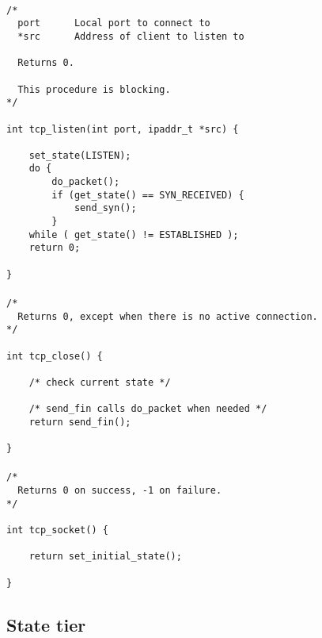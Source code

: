 \documentclass[11pt]{article}
\begin{document}
\paragraph{}


\begin{lstlisting}[title=Procedure tcp\_listen]
/*
  port      Local port to connect to
  *src      Address of client to listen to

  Returns 0.

  This procedure is blocking.
*/

int tcp_listen(int port, ipaddr_t *src) {

    set_state(LISTEN);
    do {
        do_packet();
        if (get_state() == SYN_RECEIVED) {
            send_syn();
        }
    while ( get_state() != ESTABLISHED );
    return 0;

}
\end{lstlisting}


\paragraph{}


\begin{lstlisting}[title=Procedure tcp\_close]
/*
  Returns 0, except when there is no active connection.
*/

int tcp_close() {

    /* check current state */

    /* send_fin calls do_packet when needed */
    return send_fin();

}
\end{lstlisting}


\paragraph{}


\begin{lstlisting}[title=Procedure tcp\_socket]
/*
  Returns 0 on success, -1 on failure.
*/

int tcp_socket() {

    return set_initial_state();

}
\end{lstlisting}



\subsection{State tier}
\end{document}
